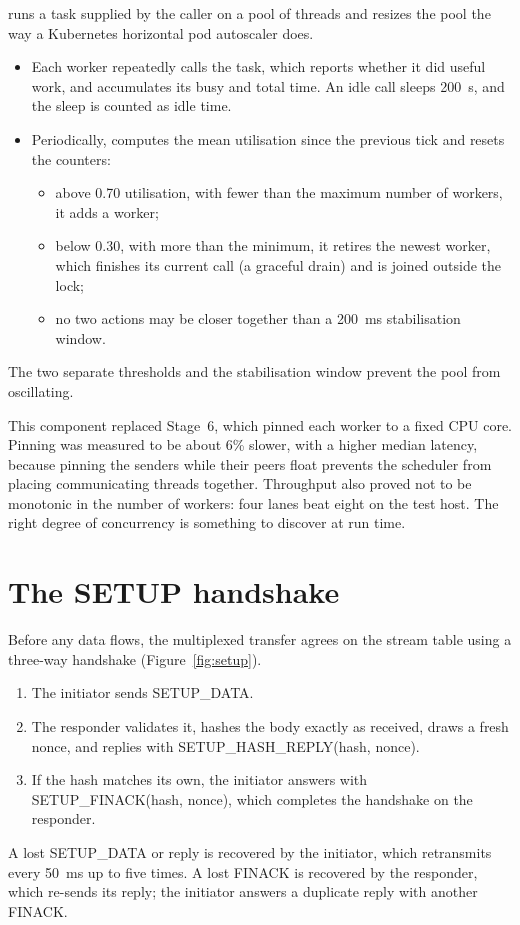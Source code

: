  runs a task supplied by the caller on a pool of threads and resizes the pool the way a
Kubernetes horizontal pod autoscaler does.
\begin{itemize}
  \item Each worker repeatedly calls the task, which reports whether it did useful work, and accumulates its
    busy and total time. An idle call sleeps 200~\textmu s, and the sleep is counted as idle time.
  \item Periodically,  computes the mean utilisation since the previous tick and resets the
    counters:
    \begin{itemize}
      \item above 0.70 utilisation, with fewer than the maximum number of workers, it adds a worker;
      \item below 0.30, with more than the minimum, it retires the newest worker, which finishes its current
        call (a graceful drain) and is joined outside the lock;
      \item no two actions may be closer together than a 200~ms stabilisation window.
    \end{itemize}
\end{itemize}
The two separate thresholds and the stabilisation window prevent the pool from oscillating.

This component replaced Stage~6, which pinned each worker to a fixed CPU core. Pinning was measured to be about
6\% slower, with a higher median latency, because pinning the senders while their peers float prevents the
scheduler from placing communicating threads together. Throughput also proved not to be monotonic in the number
of workers: four lanes beat eight on the test host. The right degree of concurrency is something to discover at
run time.

\section{The SETUP handshake}\label{sec:setup}

Before any data flows, the multiplexed transfer agrees on the stream table using a three-way handshake
(Figure~\ref{fig:setup}).
\begin{enumerate}
  \item The initiator sends SETUP\_DATA.
  \item The responder validates it, hashes the body exactly as received, draws a fresh nonce\vviii, and replies
    with SETUP\_HASH\_REPLY(hash, nonce).
  \item If the hash matches its own, the initiator answers with SETUP\_FINACK(hash, nonce), which completes the
    handshake on the responder.
\end{enumerate}
A lost SETUP\_DATA or reply is recovered by the initiator, which retransmits every 50~ms up to five times. A lost
FINACK is recovered by the responder, which re-sends its reply; the initiator answers a duplicate reply with
another FINACK.

